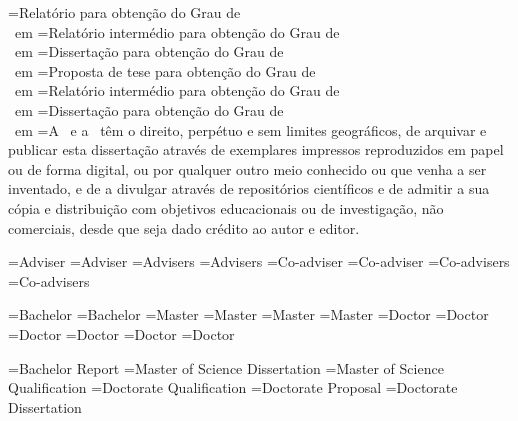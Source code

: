 \UNL@dissertationstr[bsc,pt]={Relatório para obtenção do Grau de \\\UNL@degree\ em \majorfield[\UNL@cover@lang]}
\UNL@dissertationstr[prepmsc,pt]={Relatório intermédio para obtenção do Grau de \\\UNL@degree\ em \majorfield[\UNL@cover@lang]}
\UNL@dissertationstr[msc,pt]={Dissertação para obtenção do Grau de \\\UNL@degree\ em \majorfield[\UNL@cover@lang]}
\UNL@dissertationstr[propphd,pt]={Proposta de tese para obtenção do Grau de \\\UNL@degree\ em \majorfield[\UNL@cover@lang]}
\UNL@dissertationstr[phdplan,pt]={Relatório intermédio para obtenção do Grau de \\\UNL@degree\ em \majorfield[\UNL@cover@lang]}
\UNL@dissertationstr[phd,pt]={Dissertação para obtenção do Grau de \\\UNL@degree\ em \majorfield[\UNL@cover@lang]}
\UNL@copyrighttext[pt]={A \faculty[\UNL@cover@lang]\ e a \university[\UNL@cover@lang]\ têm o direito, perpétuo e sem limites geográficos, de arquivar e publicar esta dissertação através de exemplares impressos reproduzidos em papel ou de forma digital, ou por qualquer outro meio conhecido ou que venha a ser inventado, e de a divulgar através de repositórios científicos e de admitir a sua cópia e distribuição com objetivos educacionais ou de investigação, não comerciais, desde que seja dado crédito ao autor e editor.}




\UNL@adviserstr[1,m,en]={Adviser}
\UNL@adviserstr[1,f,en]={Adviser}
\UNL@adviserstr[2,m,en]={Advisers}
\UNL@adviserstr[2,f,en]={Advisers}
\UNL@coadviserstr[1,m,en]={Co-adviser}
\UNL@coadviserstr[1,f,en]={Co-adviser}
\UNL@coadviserstr[2,m,en]={Co-advisers}
\UNL@coadviserstr[2,f,en]={Co-advisers}

\UNL@degreestr[bsc,m,en]={Bachelor}
\UNL@degreestr[bsc,f,en]={Bachelor}
\UNL@degreestr[msc,m,en]={Master}
\UNL@degreestr[msc,f,en]={Master}
\UNL@degreestr[prepmsc,m,en]={Master}
\UNL@degreestr[prepmsc,f,en]={Master}
\UNL@degreestr[phd,m,en]={Doctor}
\UNL@degreestr[phd,f,en]={Doctor}
\UNL@degreestr[phdplan,m,en]={Doctor}
\UNL@degreestr[phdplan,f,en]={Doctor}
\UNL@degreestr[propphd,m,en]={Doctor}
\UNL@degreestr[propphd,f,en]={Doctor}

\UNL@doctypestr[bsc,en]={Bachelor Report}
\UNL@doctypestr[msc,en]={Master of Science Dissertation}
\UNL@doctypestr[prepmsc,en]={Master of Science Qualification}
\UNL@doctypestr[phdplan,en]={Doctorate Qualification}
\UNL@doctypestr[propphd,en]={Doctorate Proposal}
\UNL@doctypestr[phd,en]={Doctorate Dissertation}


